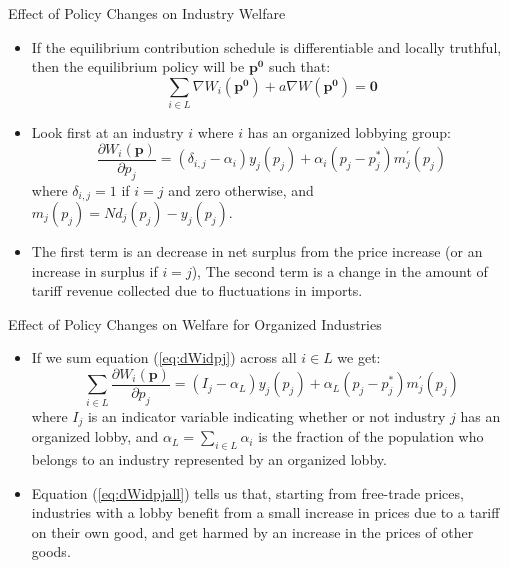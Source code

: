 \documentclass[aspectratio=169]{beamer}
\begin{document}

\begin{frame}{Effect of Policy Changes on Industry Welfare}

\begin{itemize}
    \item<1-> If the equilibrium contribution schedule is differentiable and locally truthful, then the equilibrium policy will be $ \mathbf{p^{0}} $ such that:
    \begin{equation*}
        \sum_{i \in L} \nabla W_{i}\left( \mathbf{p^{0}} \right) + a \nabla W\left( \mathbf{p^{0}} \right) = \mathbf{0}
    \end{equation*}
    \item<2-> Look first at an industry $ i $ where $ i $ has an organized lobbying group:
    \begin{equation}
        \frac{\partial W_{i}\left( \mathbf{p} \right)}{\partial p_{j}} = \left( \delta_{i,j} - \alpha_{i} \right) y_{j}\left( p_{j} \right) + \alpha_{i}\left( p_{j} - p_{j}^{*} \right) m_{j}^{'}\left( p_{j} \right)
        \label{eq:dWidpj}
    \end{equation}
    where $ \delta_{i,j} = 1 $ if $ i = j $ and zero otherwise, and $ m_{j}\left( p_{j} \right) = N d_{j}\left( p_{j} \right) - y_{j}\left( p_{j} \right) $.
    \item<3-> The first term is an decrease in net surplus from the price increase (or an increase in surplus if $ i = j $), The second term is a change in the amount of tariff revenue collected due to fluctuations in imports. 
\end{itemize}
    
\end{frame}


\begin{frame}{Effect of Policy Changes on Welfare for Organized Industries}

\begin{itemize}
    \item<1-> If we sum equation (\ref{eq:dWidpj}) across all $ i \in L $ we get:
    \begin{equation}
        \sum_{i \in L} \frac{\partial W_{i}\left( \mathbf{p} \right)}{\partial p_{j}} = \left( I_{j} - \alpha_{L} \right) y_{j}\left( p_{j} \right) + \alpha_{L}\left( p_{j} - p_{j}^{*} \right) m_{j}^{'}\left( p_{j} \right)
        \label{eq:dWidpjall}
    \end{equation}
    where $ I_{j} $ is an indicator variable indicating whether or not industry $ j $ has an organized lobby, and $ \alpha_{L} = \sum_{i \in L} \alpha_{i} $ is the fraction of the population who belongs to an industry represented by an organized lobby.
    \item<2-> Equation (\ref{eq:dWidpjall}) tells us that, starting from free-trade prices, industries with a lobby benefit from a small increase in prices due to a tariff on their own good, and get harmed by an increase in the prices of other goods.
\end{itemize}
    
\end{frame}
\end{document}
